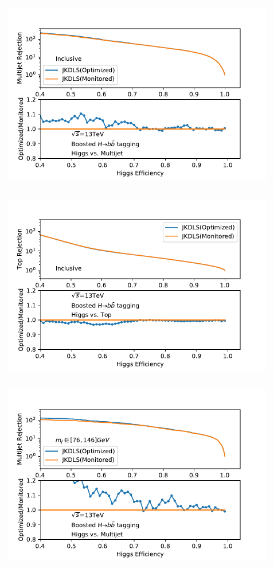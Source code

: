 \begin{figure}[htbp]
  \begin{subfigure}{.5\textwidth}
  \centering
   \includegraphics[width=0.75\textwidth]{figuresXbb/OPT/OPTQCD.pdf}
   \caption{}
   \label{fig:}
  \end{subfigure}
  \begin{subfigure}{.5\textwidth}
  \centering
   \includegraphics[width=0.75\textwidth]{figuresXbb/OPT/OPTop.pdf}
    \caption{}
   \label{fig:}
  \end{subfigure}
\newline 
   \begin{subfigure}{.5\textwidth}
  \centering
   \includegraphics[width=0.75\textwidth]{figuresXbb/OPT/OPTQCDMASS.pdf}

\end{subfigure}
\end{figure}
